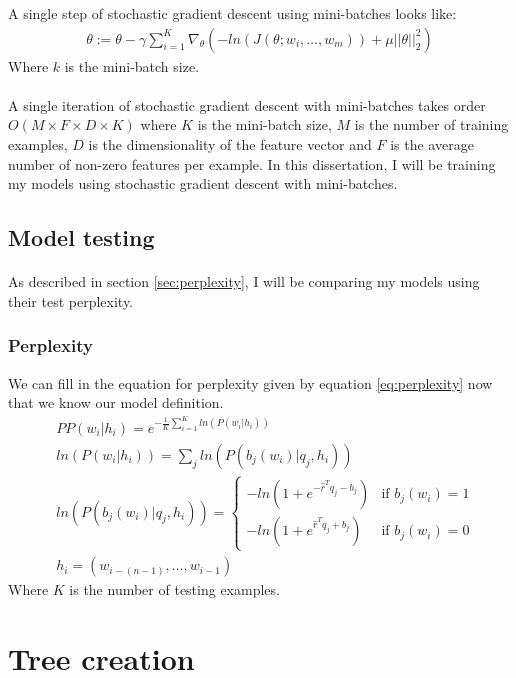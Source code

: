 \documentclass[12pt]{ociamthesis}  %
\begin{document}
A single step of stochastic gradient descent using mini-batches looks like:
\begin{align}
\theta := \theta - \gamma \sum_{i=1}^{K} \nabla_\theta \left( -ln(J(\theta;w_i,\dots, w_m)) +  \mu ||\theta||^2_2 \right)
\end{align}
Where $k$ is the mini-batch size.
\paragraph{}
A single iteration of stochastic gradient descent with mini-batches takes order $O(M\times F \times D\times K)$ where $K$ is the mini-batch size, $M$ is the number of training examples, $D$ is the dimensionality of the feature vector and $F$ is the average number of non-zero features per example. In this dissertation, I will be training my models using stochastic gradient descent with mini-batches.

\subsection{Model testing}
\paragraph{}
As described in section \ref{sec:perplexity}, I will be comparing my models using their test perplexity.
\subsubsection{Perplexity}
We can fill in the equation for perplexity given by equation \ref{eq:perplexity} now that we know our model definition.
\begin{align}
&PP(w_i | h_i)=e^{- \frac{1}{K} \sum_{i=1}^K ln( P(w_i | h_i) ) }
\\
&ln(P(w_i | h_i )) = \sum_j ln(P(b_j(w_i) | q_j, h_i)) \nonumber
\\
&ln(P(b_j(w_i) | q_j, h_i)) =  
\begin{cases}
  -ln (1 + e^{-\hat{r}^T q_{j} -b_{j}}) & \text{if } b_j(w_i)  = 1 \\
  -ln (1 + e^{\hat{r}^T q_{j} +b_{j}})     & \text{if } b_j(w_i) = 0
  \end{cases} \nonumber
\\
 & h_i = ( w_{i-(n-1)},\dots, w_{i-1} ) \nonumber
\end{align}
Where $K$ is the number of testing examples. 


\section{Tree creation} \label{sec:treeCreation}
\end{document}
